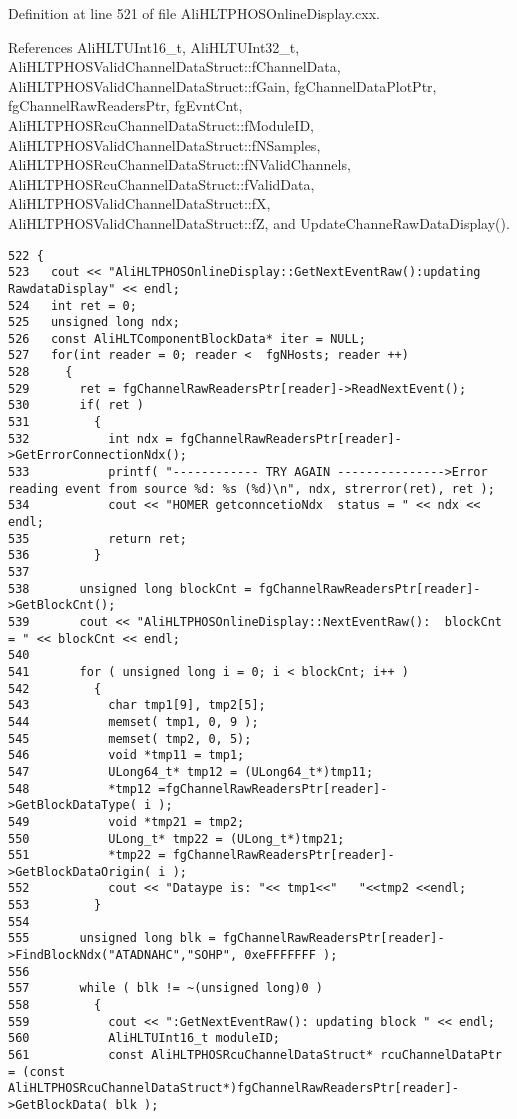 Definition at line 521 of file Ali\-HLTPHOSOnline\-Display.cxx.

References Ali\-HLTUInt16\_\-t, Ali\-HLTUInt32\_\-t, Ali\-HLTPHOSValid\-Channel\-Data\-Struct::f\-Channel\-Data, Ali\-HLTPHOSValid\-Channel\-Data\-Struct::f\-Gain, fg\-Channel\-Data\-Plot\-Ptr, fg\-Channel\-Raw\-Readers\-Ptr, fg\-Evnt\-Cnt, Ali\-HLTPHOSRcu\-Channel\-Data\-Struct::f\-Module\-ID, Ali\-HLTPHOSValid\-Channel\-Data\-Struct::f\-NSamples, Ali\-HLTPHOSRcu\-Channel\-Data\-Struct::f\-NValid\-Channels, Ali\-HLTPHOSRcu\-Channel\-Data\-Struct::f\-Valid\-Data, Ali\-HLTPHOSValid\-Channel\-Data\-Struct::f\-X, Ali\-HLTPHOSValid\-Channel\-Data\-Struct::f\-Z, and Update\-Channe\-Raw\-Data\-Display().

\footnotesize\begin{verbatim}522 {
523   cout << "AliHLTPHOSOnlineDisplay::GetNextEventRaw():updating RawdataDisplay" << endl;
524   int ret = 0;
525   unsigned long ndx;
526   const AliHLTComponentBlockData* iter = NULL;
527   for(int reader = 0; reader <  fgNHosts; reader ++)
528     {
529       ret = fgChannelRawReadersPtr[reader]->ReadNextEvent();  
530       if( ret ) 
531         {
532           int ndx = fgChannelRawReadersPtr[reader]->GetErrorConnectionNdx();
533           printf( "------------ TRY AGAIN --------------->Error reading event from source %d: %s (%d)\n", ndx, strerror(ret), ret );
534           cout << "HOMER getconncetioNdx  status = " << ndx << endl;
535           return ret; 
536         }
537       
538       unsigned long blockCnt = fgChannelRawReadersPtr[reader]->GetBlockCnt();
539       cout << "AliHLTPHOSOnlineDisplay::NextEventRaw():  blockCnt  = " << blockCnt << endl;
540 
541       for ( unsigned long i = 0; i < blockCnt; i++ ) 
542         {
543           char tmp1[9], tmp2[5];
544           memset( tmp1, 0, 9 );
545           memset( tmp2, 0, 5);
546           void *tmp11 = tmp1;
547           ULong64_t* tmp12 = (ULong64_t*)tmp11;
548           *tmp12 =fgChannelRawReadersPtr[reader]->GetBlockDataType( i );
549           void *tmp21 = tmp2;
550           ULong_t* tmp22 = (ULong_t*)tmp21;
551           *tmp22 = fgChannelRawReadersPtr[reader]->GetBlockDataOrigin( i );
552           cout << "Dataype is: "<< tmp1<<"   "<<tmp2 <<endl;
553         }
554       
555       unsigned long blk = fgChannelRawReadersPtr[reader]->FindBlockNdx("ATADNAHC","SOHP", 0xeFFFFFFF );
556 
557       while ( blk != ~(unsigned long)0 ) 
558         {
559           cout << ":GetNextEventRaw(): updating block " << endl;
560           AliHLTUInt16_t moduleID;
561           const AliHLTPHOSRcuChannelDataStruct* rcuChannelDataPtr = (const AliHLTPHOSRcuChannelDataStruct*)fgChannelRawReadersPtr[reader]->GetBlockData( blk ); 

\end{verbatim}
